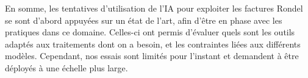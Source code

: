 \vspace{1,5cm}
En somme, les tentatives d'utilisation de l'IA pour exploiter les factures Rondel se sont d'abord appuyées sur un état de l'art, afin d'être en phase avec les pratiques dans ce domaine. Celles-ci ont permis d'évaluer quels sont les outils adaptés aux traitements dont on a besoin, et les contraintes liées aux différents modèles. Cependant, nos essais sont limités pour l'instant et demandent à être déployés à une échelle plus large. 